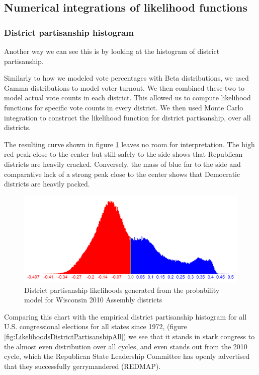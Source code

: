 \documentclass[preprint,12pt]{article}
\begin{document}
\subsection{Numerical integrations of likelihood functions}
\subsubsection{District partisanship histogram}
 
Another way we can see this is by looking at the histogram of district partisanship.
 
Similarly to how we modeled vote percentages with Beta distributions, we used Gamma distributions to model voter turnout.  We then combined these two to model actual vote counts in each district.  This allowed us to compute likelihood functions for specific vote counts in every district.  We then used Monte Carlo integration to construct the likelihood function for district partisanship, over all districts.
 
The resulting curve shown in figure \ref{fig:LikelihoodsDistrictPartisanship} leaves no room for interpretation.  The high red peak close to the center but still safely to the side shows that Republican districts are heavily cracked.  Conversely, the mass of blue far to the side and comparative lack of a strong peak close to the center shows that Democratic districts are heavily packed.
 
\begin{figure}[htb!]
    \begin{center}
        \includegraphics[scale=0.25]{../Figures/WI2010/district_partisanship_cropped.png}
        \caption{District partisanship likelihoods generated from the probability model for Wisconsin 2010 Assembly districts}\label{fig:LikelihoodsDistrictPartisanship}
    \end{center}
\end{figure}

Comparing this chart with the empirical district partisanship histogram for all U.S. congressional elections for all states since 1972, (figure \ref{fig:LikelihoodsDistrictPartisanshipAll}) we see that it stands in stark congress to the almost even distribution over all cycles, and even stands out from the 2010 cycle, which the Republican State Leadership Committee has openly advertised that they successfully gerrymandered (REDMAP).
\end{document}
